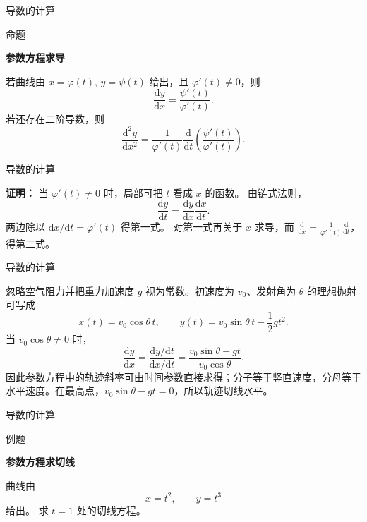 \documentclass[aspectratio=169,10pt,fontset=fandol]{ctexbeamer}
\newcommand{\dd}{\mathrm{d}}
\begin{document}
\begin{frame}[t,fragile]{导数的计算}
\footnotesize
\begin{block}{命题}
{\footnotesize
\textbf{参数方程求导}\par

若曲线由 $x=\varphi(t),\,y=\psi(t)$ 给出，且 $\varphi'(t)\neq0$，则
\[
\frac{\dd y}{\dd x}=\frac{\psi'(t)}{\varphi'(t)}.
\]
若还存在二阶导数，则
\[
\frac{\dd^2y}{\dd x^2}
=\frac{1}{\varphi'(t)}\frac{\dd}{\dd t}\left(\frac{\psi'(t)}{\varphi'(t)}\right).
\]

}
\end{block}
\end{frame}
\begin{frame}[t,fragile]{导数的计算}
\footnotesize
{\footnotesize
\textbf{证明：}
当 $\varphi'(t)\neq0$ 时，局部可把 $t$ 看成 $x$ 的函数。 由链式法则，
\[
\frac{\dd y}{\dd t}=\frac{\dd y}{\dd x}\frac{\dd x}{\dd t}.
\]
两边除以 $\dd x/\dd t=\varphi'(t)$ 得第一式。 对第一式再关于 $x$ 求导，而 $\frac{\dd}{\dd x}=\frac1{\varphi'(t)}\frac{\dd}{\dd t}$，得第二式。

}
\end{frame}
\begin{frame}[t,fragile]{导数的计算}
\footnotesize
{\footnotesize
\begin{application}
忽略空气阻力并把重力加速度 $g$ 视为常数。初速度为 $v_0$、发射角为 $\theta$ 的理想抛射可写成
\[
x(t)=v_0\cos\theta\,t,\qquad
y(t)=v_0\sin\theta\,t-\frac12gt^2.
\]
当 $v_0\cos\theta\neq0$ 时，
\[
\frac{\dd y}{\dd x}
=\frac{\dd y/\dd t}{\dd x/\dd t}
=\frac{v_0\sin\theta-gt}{v_0\cos\theta}.
\]
因此参数方程中的轨迹斜率可由时间参数直接求得；分子等于竖直速度，分母等于水平速度。在最高点，$v_0\sin\theta-gt=0$，所以轨迹切线水平。
\end{application}
}
\end{frame}
\begin{frame}[t,fragile]{导数的计算}
\footnotesize
\begin{block}{例题}
{\footnotesize
\textbf{参数方程求切线}\par

曲线由
\[
x=t^2,\qquad y=t^3
\]
给出。 求 $t=1$ 处的切线方程。

}
\end{block}
\end{frame}
\end{document}
